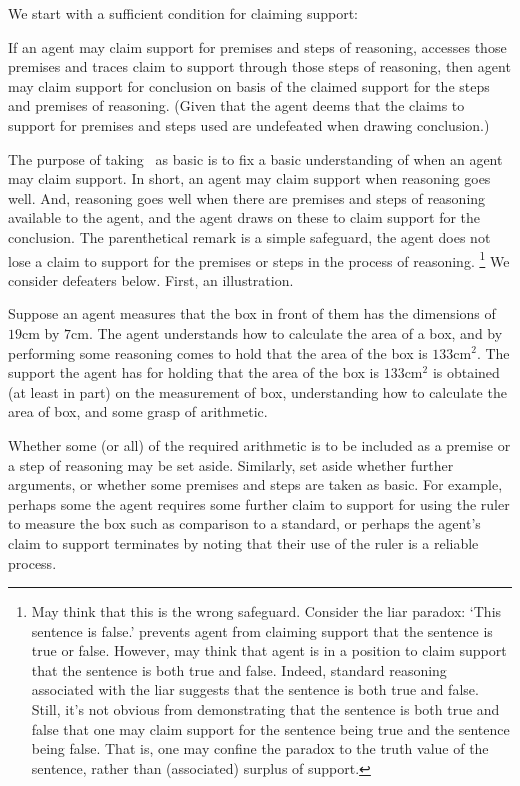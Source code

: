 \begin{note}
  We start with a sufficient condition for claiming support:
  \begin{proposition}[\USE{-} --- \USE{}]\label{prem:bP}\label{prop:USE}
    If an agent may claim support for premises and steps of reasoning, accesses those premises and traces claim to support through those steps of reasoning, then agent may claim support for conclusion on basis of the claimed support for the steps and premises of reasoning.
    (Given that the agent deems that the claims to support for premises and steps used are undefeated when drawing conclusion.)
  \end{proposition}

  The purpose of taking~\USE{} as basic is to fix a basic understanding of when an agent may claim support.
  In short, an agent may claim support when reasoning goes well.
  And, reasoning goes well when there are premises and steps of reasoning available to the agent, and the agent draws on these to claim support for the conclusion.
  The parenthetical remark is a simple safeguard, the agent does not lose a claim to support for the premises or steps in the process of reasoning.\nolinebreak
  \footnote{
    May think that this is the wrong safeguard.
    Consider the liar paradox:
    `This sentence is false.'
    \USE{} prevents agent from claiming support that the sentence is true or false.
    However, may think that agent is in a position to claim support that the sentence is both true and false.
    Indeed, standard reasoning associated with the liar suggests that the sentence is both true and false.
    Still, it's not obvious from demonstrating that the sentence is both true and false that one may claim support for the sentence being true and the sentence being false.
    That is, one may confine the paradox to the truth value of the sentence, rather than (associated) surplus of support.
  }
  We consider defeaters below.
  First, an illustration.


  Suppose an agent measures that the box in front of them has the dimensions of \(19\text{cm}\) by \(7\text{cm}\).
  The agent understands how to calculate the area of a box, and by performing some reasoning comes to hold that the area of the box is \(133\text{cm}^{2}\).
  The support the agent has for holding that the area of the box is \(133\text{cm}^{2}\) is obtained (at least in part) on the measurement of box, understanding how to calculate the area of box, and some grasp of arithmetic.

  Whether some (or all) of the required arithmetic is to be included as a premise or a step of reasoning may be set aside.
  Similarly, set aside whether further arguments, or whether some premises and steps are taken as basic.
  For example, perhaps some the agent requires some further claim to support for using the ruler to measure the box such as comparison to a standard, or perhaps the agent's claim to support terminates by noting that their use of the ruler is a reliable process.
\end{note}

